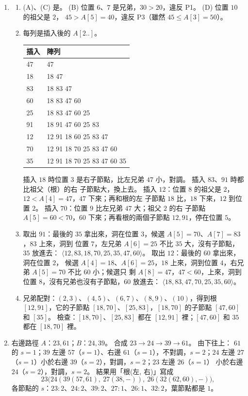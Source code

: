 \begin{enumerate}
\item
\begin{enumerate}
\item (A)、(C) 是。 (B) 位置 $6$、$7$ 是兄弟，$30 > 20$，違反 P1。 (D) 位置 $10$ 的祖父是 $2$，
$45 > A[5] = 40$，違反 P3（雖然 $45 \le A[3] = 50$）。
\item 每列是插入後的 $A[2..]$。
\begin{center}
\begin{tabular}{ll}
\toprule
插入 & 陣列 \\
\midrule
47 & 47 \\
18 & 18 47 \\
83 & 18 83 47 \\
60 & 18 83 47 60 \\
25 & 18 83 47 60 25 \\
91 & 18 91 47 60 25 83 \\
12 & 12 91 18 60 25 83 47 \\
70 & 12 91 18 70 25 83 47 60 \\
35 & 12 91 18 70 25 83 47 60 35 \\
\bottomrule
\end{tabular}
\end{center}
插入 $18$ 時位置 $3$ 是右子節點，比左兄弟 $47$ 小，對調。 插入 $83$、$91$ 時都比祖父（根）的右
子節點大，換上去。 插入 $12$：位置 $8$ 的祖父是 $2$，$12 < A[4] = 47$，$47$ 下來；再和根的左
子節點 $18$ 比，$18$ 下來，$12$ 到位置 $2$。 插入 $70$：位置 $9$ 比左兄弟 $47$ 大；祖父 $2$ 的右
子節點 $A[5] = 60 < 70$，$60$ 下來；再看根的兩個子節點 $12, 91$，停在位置 $5$。
\item 取出 $91$：最後的 $35$ 拿出來，洞在位置 $3$，候選 $A[5] = 70$、$A[7] = 83$，$83$ 上來，洞到
位置 $7$，左兄弟 $A[6] = 25$ 不比 $35$ 大，沒有子節點，$35$ 放進去：
$\langle 12, 83, 18, 70, 25, 35, 47, 60 \rangle$。 取出 $12$：最後的 $60$ 拿出來，洞在位置 $2$，
候選 $A[4] = 18$、$A[6] = 25$，$18$ 上來，洞到位置 $4$，右兄弟 $A[5] = 70$ 不比 $60$ 小；候選只
剩 $A[8] = 47$，$47 < 60$，上來，洞到位置 $8$，沒有兄弟也沒有子節點，$60$ 放進去：
$\langle 18, 83, 47, 70, 25, 35, 60 \rangle$。
\item 兄弟配對：$(2, 3)$、$(4, 5)$、$(6, 7)$、$(8, 9)$、$(10)$，得到根 $[12, 91]$，它的子節點
$[18, 70]$、$[25, 83]$，$[18, 70]$ 的子節點 $[47, 60]$ 和 $[35]$。 檢查：$[18, 70]$、$[25, 83]$
都在 $[12, 91]$ 裡；$[47, 60]$ 和 $35$ 都在 $[18, 70]$ 裡。
\end{enumerate}

\item 右邊路徑 $A$：$23, 61$；$B$：$24, 39$。 合成 $23 \to 24 \to 39 \to 61$。 由下往上：
$61$ 的 $s = 1$；$39$ 左邊 $57$（$s = 1$）、右邊 $61$（$s = 1$），不對調，$s = 2$；$24$
左邊 $27$（$s = 1$）小於右邊 $39$（$s = 2$），對調，$s = 2$；$23$ 左邊 $26$（$s = 1$）
小於右邊 $24$（$s = 2$），對調，$s = 2$。 結果用「根(左, 右)」寫成
\[
23\bigl(24(39(57, 61),\ 27(38, -)),\ 26(32(62, 60), -)\bigr),
\]
各節點的 $s$：$23{:}2$、$24{:}2$、$39{:}2$、$27{:}1$、$26{:}1$、$32{:}2$，葉節點都是 $1$。


\end{enumerate}

